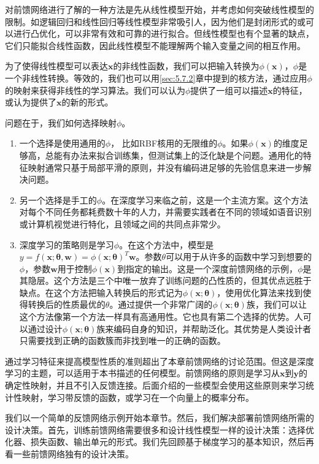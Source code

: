 对前馈网络进行了解的一种方法是先从线性模型开始，并考虑如何突破线性模型的限制。如逻辑回归和线性回归等线性模型非常吸引人，因为他们是封闭形式的或可以进行凸优化，可以非常有效和可靠的进行拟合。但线性模型也有个显著的缺点，它们只能拟合线性函数，因此线性模型不能理解两个输入变量之间的相互作用。


为了使得线性模型可以表达$\bm{x}$的非线性函数，我们可以把输入转换为$\phi(\bm{x})$，$\phi$是一个非线性转换。等效的，我们也可以用\ref{sec:5.7.2}章中提到的核方法，通过应用$\phi$的映射来获得非线性的学习算法。我们可以认为$\phi$提供了一组可以描述$\bm{x}$的特征，或认为提供了$\bm{x}$的新的形式。


问题在于，我们如何选择映射$\phi$。

\begin{enumerate}
 	\item 一个选择是使用通用的$\phi$， 比如RBF核用的无限维的$\phi$。如果$\phi(\bm{x})$的维度足够高，总能有办法来拟合训练集，但测试集上的泛化缺是个问题。通用化的特征映射通常只基于局部平滑的原则，并没有编码进足够的先验信息来进一步解决问题。
	\item 另一个选择是手工的$\phi$。在深度学习来临之前，这是一个主流方案。这个方法对每个不同任务都耗费数十年的人力，并需要实践者在不同的领域如语音识别或计算机视觉进行特化，且领域之间的共同点非常少。
	\item 深度学习的策略则是学习$\phi$。在这个方法中，模型是$y=f(\bm{x};\bm{\theta},\bm{w}) = \phi(\bm{x};\bm{\theta})^T\bm{w}$。参数$\theta$可以用于从许多的函数中学习到想要的$\phi$，参数$\bm{w}$用于控制$\phi(\bm{x})$到指定的输出。这是一个深度前馈网络的示例，$\phi$是其隐层。这个方法是三个中唯一放弃了训练问题的凸性质的，但其优点远胜于缺点。在这个方法把输入转换后的形式记为$\phi(\bm{x};\bm{\theta})$，使用优化算法来找到使得转换后的性质最优的$\theta$。通过提供一个非常广阔的$\phi(\bm{x};\bm{\theta})$族，我们可以让这个方法像第一个方法一样具有高通用性。它也具有第二个选择的优势。人可以通过设计$\phi(\bm{x};\bm{\theta})$族来编码自身的知识，并帮助泛化。其优势是人类设计者只需要找到正确的函数簇而非找到唯一的正确的函数。
\end{enumerate}


通过学习特征来提高模型性质的准则超出了本章前馈网络的讨论范围。但这是深度学习的主题，可以适用于本书描述的任何模型。前馈网络的原则是学习从$\bm{x}$到$\bm{y}$的确定性映射，并且不引入反馈连接。后面介绍的一些模型会使用这些原则来学习统计性映射，学习带反馈的函数，或学习在一个向量上的概率分布。


我们以一个简单的反馈网络示例开始本章节。然后，我们解决部署前馈网络所需的设计决策。首先，训练前馈网络需要很多和设计线性模型一样的设计决策：选择优化器、损失函数、输出单元的形式。我们先回顾基于梯度学习的基本知识，然后再看一些前馈网络独有的设计决策。